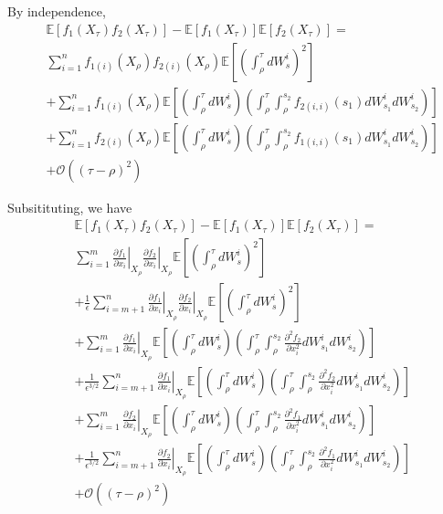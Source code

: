 \documentclass[12pt]{article}
\begin{document}
By independence,
\begin{equation}
\begin{aligned}
&\mathbb{E} \left[ f_1(X_\tau) f_2(X_\tau) \right] - \mathbb{E}[f_1(X_\tau)]\mathbb{E}[f_2(X_\tau)] = \\
& \sum_{i=1}^n f_{1(i)} (X_\rho) f_{2(i)} (X_\rho) \mathbb{E} \left[ \left( \int_\rho^\tau dW_s^i \right)^2 \right] \\
& + \sum_{i=1}^n f_{1(i)} (X_\rho) \mathbb{E} \left[ \left( \int_\rho^\tau dW_s^i  \right) \left( \int_\rho^\tau \int_\rho^{s_2} f_{2(i,i)} (s_1) dW_{s_1}^i dW_{s_2}^i  \right) \right] \\
& + \sum_{i=1}^n f_{2(i)} (X_\rho)  \mathbb{E} \left[ \left( \int_\rho^\tau dW_s^i \right)  \left( \int_\rho^\tau \int_\rho^{s_2} f_{1(i,i)} (s_1) dW_{s_1}^i dW_{s_2}^i \right) \right] \\
&+ \mathcal{O} ((\tau - \rho)^2 ) 
\end{aligned}
\end{equation}

Subsitituting, we have
\begin{equation}
\begin{aligned}
&\mathbb{E} \left[ f_1(X_\tau) f_2(X_\tau) \right] - \mathbb{E}[f_1(X_\tau)]\mathbb{E}[f_2(X_\tau)] = \\
& \sum_{i=1}^m \left. \frac{\partial f_1}{\partial x_i} \right|_{X_\rho} \left. \frac{\partial f_2}{\partial x_i} \right|_{X_\rho}  \mathbb{E} \left[ \left( \int_\rho^\tau dW_s^i \right)^2 \right] \\
& + \frac{1}{\epsilon} \sum_{i=m+1}^n \left. \frac{\partial f_1}{\partial x_i} \right|_{X_\rho} \left. \frac{\partial f_2}{\partial x_i} \right|_{X_\rho}  \mathbb{E} \left[ \left( \int_\rho^\tau dW_s^i \right)^2 \right] \\
& + \sum_{i=1}^m \left. \frac{\partial f_1}{\partial x_i} \right|_{X_\rho} \mathbb{E} \left[ \left( \int_\rho^\tau dW_s^i  \right) \left( \int_\rho^\tau \int_\rho^{s_2} \frac{\partial^2 f_2}{\partial x_i^2} dW_{s_1}^i dW_{s_2}^i  \right) \right] \\
& + \frac{1}{\epsilon^{3/2}} \sum_{i=m+1}^n \left. \frac{\partial f_1}{\partial x_i} \right|_{X_\rho} \mathbb{E} \left[ \left( \int_\rho^\tau dW_s^i  \right) \left( \int_\rho^\tau \int_\rho^{s_2} \frac{\partial^2 f_2}{\partial x_i^2} dW_{s_1}^i dW_{s_2}^i  \right) \right] \\
& + \sum_{i=1}^m \left. \frac{\partial f_2}{\partial x_i} \right|_{X_\rho}  \mathbb{E} \left[ \left( \int_\rho^\tau dW_s^i \right)  \left( \int_\rho^\tau \int_\rho^{s_2} \frac{\partial^2 f_1}{\partial x_i^2}  dW_{s_1}^i dW_{s_2}^i \right) \right] \\
& + \frac{1}{\epsilon^{3/2}} \sum_{i=m+1}^n \left. \frac{\partial f_2}{\partial x_i} \right|_{X_\rho}  \mathbb{E} \left[ \left( \int_\rho^\tau dW_s^i \right)  \left( \int_\rho^\tau \int_\rho^{s_2} \frac{\partial^2 f_1}{\partial x_i^2}  dW_{s_1}^i dW_{s_2}^i \right) \right] \\
&+ \mathcal{O} ((\tau - \rho)^2 ) 
\end{aligned}
\end{equation}
\end{document}
